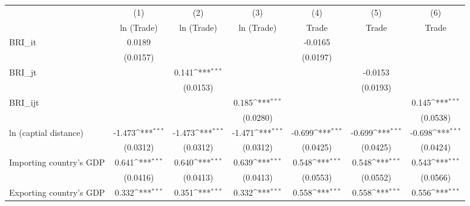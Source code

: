 {
\def\sym#1{\ifmmode^{#1}\else\(^{#1}\)\fi}
\begin{tabular}{l*{6}{c}}
\hline\hline
                    &\multicolumn{1}{c}{(1)}&\multicolumn{1}{c}{(2)}&\multicolumn{1}{c}{(3)}&\multicolumn{1}{c}{(4)}&\multicolumn{1}{c}{(5)}&\multicolumn{1}{c}{(6)}\\
                    &\multicolumn{1}{c}{ln (Trade)}&\multicolumn{1}{c}{ln (Trade)}&\multicolumn{1}{c}{ln (Trade)}&\multicolumn{1}{c}{Trade}&\multicolumn{1}{c}{Trade}&\multicolumn{1}{c}{Trade}\\
\hline
BRI\_it              &      0.0189         &                     &                     &     -0.0165         &                     &                     \\
                    &    (0.0157)         &                     &                     &    (0.0197)         &                     &                     \\
[1em]
BRI\_jt              &                     &       0.141\sym{***}&                     &                     &     -0.0153         &                     \\
                    &                     &    (0.0153)         &                     &                     &    (0.0193)         &                     \\
[1em]
BRI\_ijt             &                     &                     &       0.185\sym{***}&                     &                     &       0.145\sym{***}\\
                    &                     &                     &    (0.0280)         &                     &                     &    (0.0538)         \\
[1em]
ln (captial distance)&      -1.473\sym{***}&      -1.473\sym{***}&      -1.471\sym{***}&      -0.699\sym{***}&      -0.699\sym{***}&      -0.698\sym{***}\\
                    &    (0.0312)         &    (0.0312)         &    (0.0312)         &    (0.0425)         &    (0.0425)         &    (0.0424)         \\
[1em]
Importing country's GDP&       0.641\sym{***}&       0.640\sym{***}&       0.639\sym{***}&       0.548\sym{***}&       0.548\sym{***}&       0.543\sym{***}\\
                    &    (0.0416)         &    (0.0413)         &    (0.0413)         &    (0.0553)         &    (0.0552)         &    (0.0566)         \\
[1em]
Exporting country's GDP&       0.332\sym{***}&       0.351\sym{***}&       0.332\sym{***}&       0.558\sym{***}&       0.558\sym{***}&       0.556\sym{***}\\

\end{tabular}}
